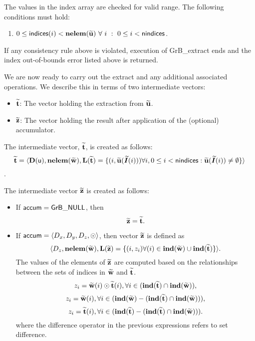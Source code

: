 The values in the index array are checked for valid range.  The following
conditions must hold:
\begin{enumerate}
	\item $0 \leq {\sf indices}(i) < \bold{nelem}({\bf \widetilde{u}})
    ~ \forall ~ i ~ : ~ 0 \leq i < {\sf nindices}$.
\end{enumerate}
If any consistency rule above is violated, execution of {\sf GrB\_extract} ends and 
the index out-of-bounds error listed above is returned.

We are now ready to carry out the extract and any additional 
associated operations.  We describe this in terms of two intermediate vectors:
\begin{itemize}
	\item ${\bf \widetilde{t}}$: The vector holding the extraction from
    ${\bf \widetilde{u}}$.
	\item ${\bf \widetilde{z}}$: The vector holding the result after 
    application of the (optional) accumulator.
\end{itemize}

The intermediate vector, ${\bf \widetilde{t}}$, is created as follows:
\[ {\bf \widetilde{t}} = \langle
\bold{D}({\sf u}), \bold{nelem}({\bf \widetilde{w}}),
\bold{L}({\bf \widetilde{t}}) =
\{(i,{\bf \widetilde{u}}(\bm{\widetilde{I}}(i))) \forall i, 0 \leq i < {\sf nindices} : 
{\bf \widetilde{u}}(\bm{\widetilde{I}}(i)) \neq \emptyset \} \rangle \]
.

The intermediate vector ${\bf \widetilde{z}}$ is created as follows:
\begin{itemize}
    \item If ${\sf accum} = {\sf GrB\_NULL}$, then \[ {\bf \widetilde{z}} = {\bf \widetilde{t}}.\]

    \item If ${\sf accum} = \langle D_x, D_y, D_z, \odot \rangle$, then vector ${\bf \widetilde{z}}$ is defined as 
        \[ \langle D_z, \bold{nelem}({\bf \widetilde{w}}), \bold{L}({\bf \widetilde{z}})
		= \{(i,z_{i})  \forall (i) \in \bold{ind}({\bf \widetilde{w}}) \cup 
        \bold{ind}({\bf \widetilde{t}}) \} \rangle.\]
    The values of the elements of ${\bf \widetilde{z}}$ are computed based on the relationships between the sets of indices in ${\bf \widetilde{w}}$ and ${\bf \widetilde{t}}$.
\[
z_{i} = {\bf \widetilde{w}}(i) \odot {\bf \widetilde{t}}(i), \forall i \in  (\bold{ind}({\bf \widetilde{t}}) \cap \bold{ind}({\bf \widetilde{w}})),
\]
\[
z_{i} = {\bf \widetilde{w}}(i), \forall  i \in  (\bold{ind}({\bf \widetilde{w}}) - (\bold{ind}({\bf \widetilde{t}}) \cap \bold{ind}({\bf \widetilde{w}}))),
\]
\[
z_{i} = {\bf \widetilde{t}}(i), \forall  i \in  (\bold{ind}({\bf \widetilde{t}}) - (\bold{ind}({\bf \widetilde{t}}) \cap \bold{ind}({\bf \widetilde{w}}))).
\]
where the difference operator in the previous expressions refers to set difference.
\end{itemize}

